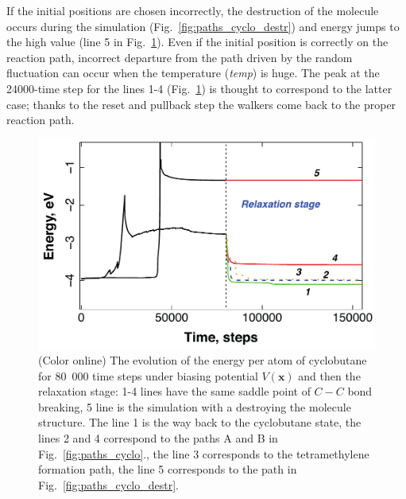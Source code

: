 \documentclass[preprint,12pt]{elsarticle}
\begin{document}
If the initial positions are chosen incorrectly, the destruction of the molecule occurs during the simulation (Fig.~\ref{fig:paths_cyclo_destr}) and energy jumps to the high value (line 5 in Fig.~\ref{fig:E_cyclo}). Even if the initial position is correctly on the reaction path, incorrect departure from the path driven by the random fluctuation can occur when the temperature ({\it temp}) is huge. The peak at the 24000-time step for the lines 1-4 (Fig.~\ref{fig:E_cyclo}) is thought to correspond to the latter case; thanks to the reset and pullback step the walkers come back to the proper reaction path.  

\begin{figure}[!t]
 \begin{center}
 \includegraphics[scale=0.75]{Energy_cyclo.pdf}
  \caption{(Color online) The evolution of the energy per atom of cyclobutane for 80~000 time steps under biasing potential $V({\bm x})$ and then the relaxation stage: 
 1-4 lines have the same saddle point of $C-C$ bond breaking, 
 5 line is the simulation with a destroying the molecule structure. 
  The line 1 is the way back to the cyclobutane state, the lines 2 and 4 correspond to the paths A and B in Fig.~\ref{fig:paths_cyclo}., the line 3 corresponds to the tetramethylene formation path, the line 5 corresponds to the path in Fig.~\ref{fig:paths_cyclo_destr}.}
  \label{fig:E_cyclo}
 \end{center}
\end{figure}
\end{document}
